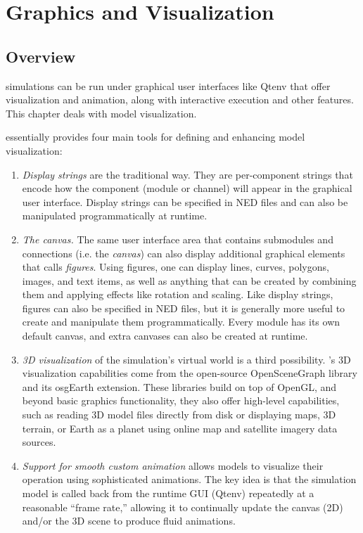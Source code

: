 \chapter{Graphics and Visualization}
\label{cha:graphics}

\section{Overview}
\label{sec:graphics:overview}

{\opp} simulations can be run under graphical user interfaces like Qtenv
that offer visualization and animation, along with interactive
execution and other features. This chapter deals with model visualization.

{\opp} essentially provides four main tools for defining and enhancing
model visualization:

\begin{enumerate}

    \item \textit{Display strings} are the traditional way. They are
    per-component strings that encode how the component (module or channel)
    will appear in the graphical user interface. Display strings can be
    specified in NED files and can also be manipulated programmatically at
    runtime.

    \item \textit{The canvas.} The same user interface area that contains
    submodules and connections (i.e. the \textit{canvas}) can also display
    additional graphical elements that {\opp} calls \textit{figures}. Using
    figures, one can display lines, curves, polygons, images, and text items,
    as well as anything that can be created by combining them and applying effects like
    rotation and scaling. Like display strings, figures can also be specified
    in NED files, but it is generally more useful to create and manipulate them
    programmatically. Every module has its own default canvas, and extra canvases
    can also be created at runtime.

    \item \textit{3D visualization} of the simulation's virtual world is a
    third possibility. {\opp}'s 3D visualization capabilities come from the
    open-source OpenSceneGraph library and its osgEarth extension. These
    libraries build on top of OpenGL, and beyond basic graphics functionality,
    they also offer high-level capabilities, such as reading 3D model files
    directly from disk or displaying maps, 3D terrain, or Earth as a planet
    using online map and satellite imagery data sources.

    \item \textit{Support for smooth custom animation} allows models to visualize
    their operation using sophisticated animations. The key idea is that the
    simulation model is called back from the runtime GUI (Qtenv) repeatedly
    at a reasonable ``frame rate,'' allowing it to continually update the
    canvas (2D) and/or the 3D scene to produce fluid animations.

\end{enumerate}

